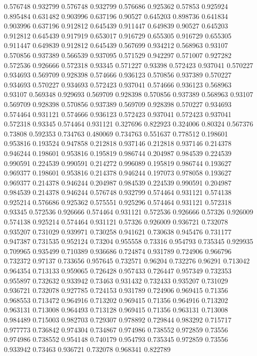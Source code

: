 0.576748 0.932799
0.576748 0.932799
0.576686 0.925362
0.57853 0.925924
0.895484 0.631482
0.903996 0.637196
0.90527 0.645203
0.898736 0.641834
0.903996 0.637196
0.912812 0.645439
0.911447 0.649839
0.90527 0.645203
0.912812 0.645439
0.917919 0.653017
0.916729 0.655305
0.916729 0.655305
0.911447 0.649839
0.912812 0.645439
0.567699 0.934212
0.568963 0.93107
0.570856 0.937389
0.566539 0.937095
0.571529 0.942297
0.571007 0.927282
0.572536 0.926666
0.572318 0.93345
0.571227 0.93398
0.572423 0.937041
0.570227 0.934693
0.569709 0.928398
0.574666 0.936123
0.570856 0.937389
0.570227 0.934693
0.570227 0.934693
0.572423 0.937041
0.574666 0.936123
0.568963 0.93107
0.569348 0.929693
0.569709 0.928398
0.570856 0.937389
0.568963 0.93107
0.569709 0.928398
0.570856 0.937389
0.569709 0.928398
0.570227 0.934693
0.574464 0.931121
0.574666 0.936123
0.572423 0.937041
0.572423 0.937041
0.572318 0.93345
0.574464 0.931121
0.327696 0.822923
0.324006 0.80324
0.567376 0.73808
0.592353 0.734763
0.480069 0.734763
0.551637 0.778512
0.198601 0.953816
0.193524 0.947858
0.212818 0.937146
0.212818 0.937146
0.214378 0.946244
0.198601 0.953816
0.195819 0.986744
0.204987 0.984539
0.224539 0.990591
0.224539 0.990591
0.214272 0.996089
0.195819 0.986744
0.193627 0.969377
0.198601 0.953816
0.214378 0.946244
0.197073 0.978058
0.193627 0.969377
0.214378 0.946244
0.204987 0.984539
0.224539 0.990591
0.204987 0.984539
0.214378 0.946244
0.576748 0.932799
0.574464 0.931121
0.574138 0.925214
0.576686 0.925362
0.575551 0.925296
0.574464 0.931121
0.572318 0.93345
0.572536 0.926666
0.574464 0.931121
0.572536 0.926666
0.57326 0.926009
0.574138 0.925214
0.574464 0.931121
0.57326 0.926009
0.936721 0.732078
0.935207 0.731029
0.939971 0.730258
0.941621 0.730638
0.945476 0.731177
0.947387 0.731535
0.952124 0.73204
0.955558 0.73316
0.954793 0.735345
0.929935 0.709965
0.935499 0.710389
0.936686 0.724874
0.931789 0.724906
0.966796 0.732372
0.97137 0.733656
0.957645 0.732571
0.96204 0.732276
0.96291 0.713042
0.964354 0.713133
0.959065 0.726428
0.957433 0.726447
0.957349 0.732353
0.955897 0.732632
0.933942 0.73463
0.931432 0.732433
0.935207 0.731029
0.936721 0.732078
0.927785 0.724153
0.931789 0.724906
0.969415 0.71356
0.968553 0.713472
0.964916 0.713202
0.969415 0.71356
0.964916 0.713202
0.963131 0.713008
0.964493 0.713128
0.969415 0.71356
0.963131 0.713008
0.984489 0.715003
0.982703 0.729307
0.978892 0.729844
0.983292 0.715717
0.977773 0.736842
0.974304 0.734867
0.974986 0.738552
0.972859 0.73556
0.974986 0.738552
0.954148 0.740179
0.954793 0.735345
0.972859 0.73556
0.933942 0.73463
0.936721 0.732078
0.968341 0.822789
